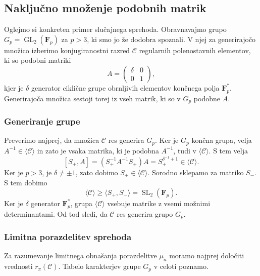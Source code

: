 \documentclass[11pt]{book}
\def\conclass{\mathcal{C}}
\def\FF{\mathbf{F}}
\DeclareMathOperator\GL{GL}
\DeclareMathOperator\SL{SL}
\theoremstyle{definition}
\theoremstyle{zgled}
\theoremstyle{odprtproblem}
\theoremstyle{domacanaloga}
\theoremstyle{izrek}
\begin{document}
\subsection{Naključno množenje podobnih matrik}

Oglejmo si konkreten primer slučajnega sprehoda. Obravnavajmo grupo $G_p = \GL_2(\FF_p)$ za $p > 3$, ki smo jo že dodobra spoznali. V njej za generirajočo množico izberimo konjugiranostni razred $\conclass$ regularnih polenostavnih elementov, ki so podobni matriki
\[
    A = \begin{pmatrix}
        \delta & 0 \\ 0 & 1 
    \end{pmatrix},
\] 
kjer je $\delta$ generator ciklične grupe obrnljivih elementov končnega polja $\FF_p^*$. Generirajoča množica sestoji torej iz vseh matrik, ki so v $G_p$ podobne $A$.

\subsubsection{Generiranje grupe}

Preverimo najprej, da množica $\conclass$ res generira $G_p$. Ker je $G_p$ končna grupa, velja $A^{-1} \in \langle \conclass \rangle$ in zato je vsaka matrika, ki je podobna $A^{-1}$, tudi v $\langle \conclass \rangle$. S tem velja
\[
    [S_+, A] = (S_+^{-1} A^{-1} S_+) A  = S_+^{\delta^{-1} + 1}
    \in \langle \conclass \rangle.
\]
Ker je $p > 3$, je $\delta \neq \pm 1$, zato dobimo $S_+ \in \langle \conclass \rangle$. Sorodno sklepamo za matriko $S_-$. S tem dobimo
\[
    \textstyle \langle \conclass \rangle \geq \langle S_+, S_- \rangle = \SL_2(\FF_p).
\]
Ker je $\delta$ generator $\FF_p^*$, grupa $\langle \conclass \rangle$ vsebuje matrike z vsemi možnimi determinantami. Od tod sledi, da $\conclass$ res generira grupo $G_p$.

\subsubsection{Limitna porazdelitev sprehoda}

Za razumevanje limitnega obnašanja porazdelitve $\mu_n$ moramo najprej določiti vrednosti $r_{\pi}(\conclass)$. Tabelo karakterjev grupe $G_p$ v celoti poznamo.
\end{document}
